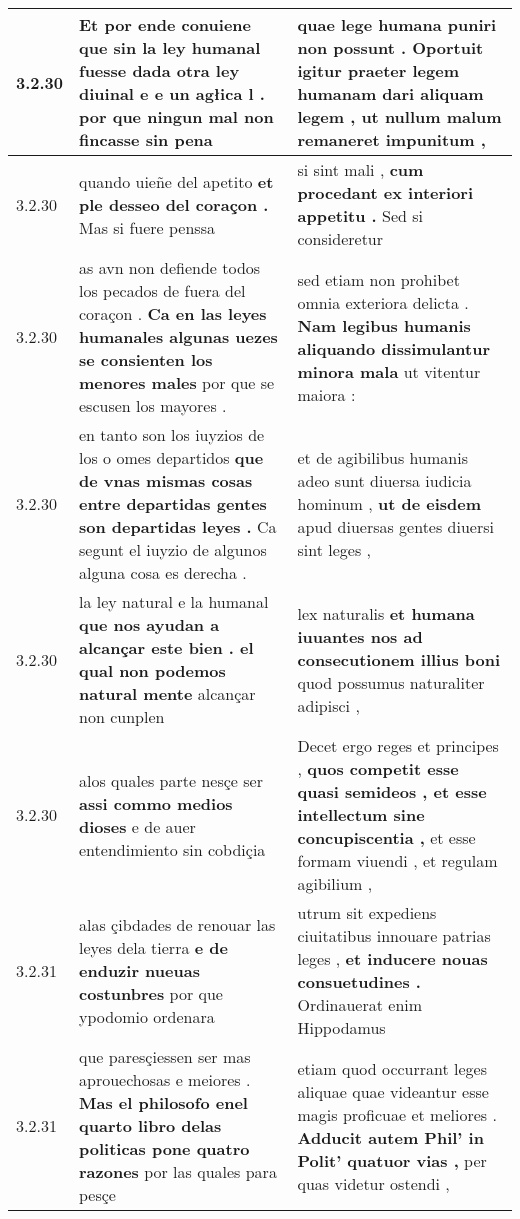 \begin{tabular}{|p{1cm}|p{6.5cm}|p{6.5cm}|}
3.2.30 & Et por ende conuiene que sin la ley humanal fuesse dada otra ley diuinal \textbf{ e e un agłica l . } por que ningun mal non fincasse sin pena & quae lege humana puniri non possunt . \textbf{ Oportuit igitur praeter legem humanam dari aliquam legem , } ut nullum malum remaneret impunitum , \\\hline
3.2.30 & quando uieñe del apetito \textbf{ et ple desseo del coraçon . } Mas si fuere penssa & si sint mali , \textbf{ cum procedant ex interiori appetitu . } Sed si consideretur \\\hline
3.2.30 & as avn non defiende todos los pecados de fuera del coraçon . \textbf{ Ca en las leyes humanales algunas uezes se consienten los menores males } por que se escusen los mayores . & sed etiam non prohibet omnia exteriora delicta . \textbf{ Nam legibus humanis aliquando dissimulantur minora mala } ut vitentur maiora : \\\hline
3.2.30 & en tanto son los iuyzios de los o omes departidos \textbf{ que de vnas mismas cosas entre departidas gentes son departidas leyes . } Ca segunt el iuyzio de algunos alguna cosa es derecha . & et de agibilibus humanis adeo sunt diuersa iudicia hominum , \textbf{ ut de eisdem } apud diuersas gentes diuersi sint leges , \\\hline
3.2.30 & la ley natural e la humanal \textbf{ que nos ayudan a alcançar este bien . el qual non podemos natural mente } alcançar non cunplen & lex naturalis \textbf{ et humana iuuantes nos ad consecutionem illius boni } quod possumus naturaliter adipisci , \\\hline
3.2.30 & alos quales parte nesçe ser \textbf{ assi commo medios dioses } e de auer entendimiento sin cobdiçia & Decet ergo reges et principes , \textbf{ quos competit esse quasi semideos , et esse intellectum sine concupiscentia , } et esse formam viuendi , et regulam agibilium , \\\hline
3.2.31 & alas çibdades de renouar las leyes dela tierra \textbf{ e de enduzir nueuas costunbres } por que ypodomio ordenara & utrum sit expediens ciuitatibus innouare patrias leges , \textbf{ et inducere nouas consuetudines . } Ordinauerat enim Hippodamus \\\hline
3.2.31 & que paresçiessen ser mas aprouechosas e meiores . \textbf{ Mas el philosofo enel quarto libro delas politicas pone quatro razones } por las quales para pesçe & etiam quod occurrant leges aliquae quae videantur esse magis proficuae et meliores . \textbf{ Adducit autem Phil’ in Polit’ quatuor vias , } per quas videtur ostendi , \\\hline

\end{tabular}
